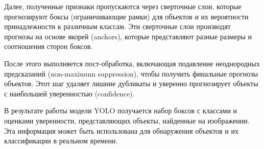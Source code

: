 Далее, полученные признаки пропускаются через сверточные слои, которые прогнозируют боксы (ограничивающие рамки) для объектов и их вероятности принадлежности к различным классам. Эти сверточные слои производят прогнозы на основе якорей (anchors), которые представляют разные размеры и соотношения сторон боксов.

После этого выполняется пост-обработка, включающая подавление неоднородных предсказаний (non-maximum suppression), чтобы получить финальные прогнозы объектов. Этот шаг удаляет лишние дубликаты и уверенно прогнозирует объекты с наибольшей уверенностью (confidence).

В результате работы модели YOLO получается набор боксов с классами и оценками уверенности, представляющих объекты, найденные на изображении. 
Эта информация может быть использована для обнаружения объектов и их классификации в реальном времени.
